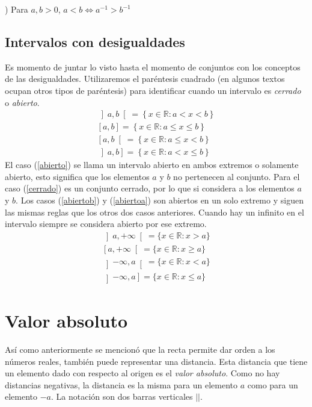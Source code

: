 ) Para $a,b>0$, $a<b\Leftrightarrow a^{-1}>b^{-1}$

\subsection{Intervalos con desigualdades}
Es momento de juntar lo visto hasta el momento de conjuntos con los conceptos de las desigualdades. Utilizaremos el paréntesis cuadrado (en algunos textos ocupan otros tipos de paréntesis) para identificar cuando un intervalo es \textit{cerrado} o \textit{abierto}.\\
\begin{eqnarray}
\left] a,b\right[ =\left\{x\in\mathbb{R}:a<x<b\right\} \label{abierto}\\
\left[ a,b\right] = \left\{x\in\mathbb{R}:a\leq x\leq b\right\}\label{cerrado} \\
\left[a,b\right[=\left\{x\in\mathbb{R}:a\leq x< b\right\}\label{abiertob} \\
\left]a,b\right]=\left\{x\in\mathbb{R}:a< x\leq b\right\} \label{abiertoa}
\end{eqnarray}
El caso (\ref{abierto}) se llama un intervalo abierto en ambos extremos o solamente abierto, esto significa que los elementos $a$ y $b$ no pertenecen al conjunto. Para el caso (\ref{cerrado}) es un conjunto cerrado, por lo que si considera a los elementos $a$ y $b$. Los casos (\ref{abiertob}) y (\ref{abiertoa}) son abiertos en un solo extremo y siguen las mismas reglas que los otros dos casos anteriores. Cuando hay un infinito en el intervalo siempre se considera abierto por ese extremo.
\begin{eqnarray}
\left]a,+\infty\right[=\{x\in\mathbb{R}:x>a\}\\
\left[a,+\infty\right[=\{x\in\mathbb{R}:x\geq a\}\\
\left]-\infty ,a\right[=\{x\in\mathbb{R}:x< a\}\\
\left]-\infty ,a\right]=\{x\in\mathbb{R}:x\leq a\}
\label{interif}
\end{eqnarray}

\section{Valor absoluto}
Así como anteriormente se mencionó que la recta permite dar orden a los números reales, también puede representar una distancia. Esta distancia que tiene un elemento dado con respecto al origen es el \textit{valor absoluto}. Como no hay distancias negativas, la distancia es la misma para un elemento $a$ como para un elemento $-a$. La notación son dos barras verticales $||$.

